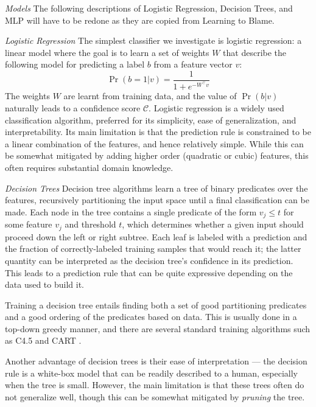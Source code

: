 \documentclass[conference]{IEEEtran}
\begin{document}
\emph{Models} The following descriptions of Logistic Regression, Decision Trees,
and MLP will have to be redone as they are copied from Learning to Blame.

\emph{Logistic Regression}
The simplest classifier we investigate is logistic regression:
a linear model where the goal is to learn a set of weights $W$
that describe the following model for predicting a label
$b$ from a feature vector $v$:
%
\[ \Pr(b = 1 | v) = \frac{1}{1 + e^{-W^{\top} v}} \]
%
The weights $W$ are learnt from training data, and the value of
$\Pr(b | v)$ naturally leads to a confidence score $\mathcal{C}$.
%
Logistic regression is a widely used classification algorithm, preferred
for its simplicity, ease of generalization, and interpretability.
%
Its main limitation is that the prediction rule is constrained to be a
linear combination of the features, and hence relatively simple.
%
While this can be somewhat mitigated by adding higher order (quadratic
or cubic) features, this often requires substantial domain knowledge.

\emph{Decision Trees}
Decision tree algorithms learn a tree of binary predicates over the
features, recursively partitioning the input space until a final
classification can be made.
%
Each node in the tree contains a single predicate of the form
$v_j \leq t$ for some feature $v_j$ and threshold $t$, which determines
whether a given input should proceed down the left or right subtree.
%
Each leaf is labeled with a prediction and the fraction of
correctly-labeled training samples that would reach it; the latter
quantity can be interpreted as the decision tree's confidence in its
prediction.
%
This leads to a prediction rule that can be quite expressive depending
on the data used to build it.

Training a decision tree entails finding both a set of good partitioning
predicates and a good ordering of the predicates based on data.
%
This is usually done in a top-down greedy manner, and there are several
standard training algorithms such as C4.5 \cite{Quinlan1993-de} and
CART \cite{Breiman1984-qy}.

Another advantage of decision trees is their ease of interpretation ---
the decision rule is a white-box model that can be readily described to
a human, especially when the tree is small.
%
However, the main limitation is that these trees often do not generalize
well, though this can be somewhat mitigated by \emph{pruning} the tree.
\end{document}
